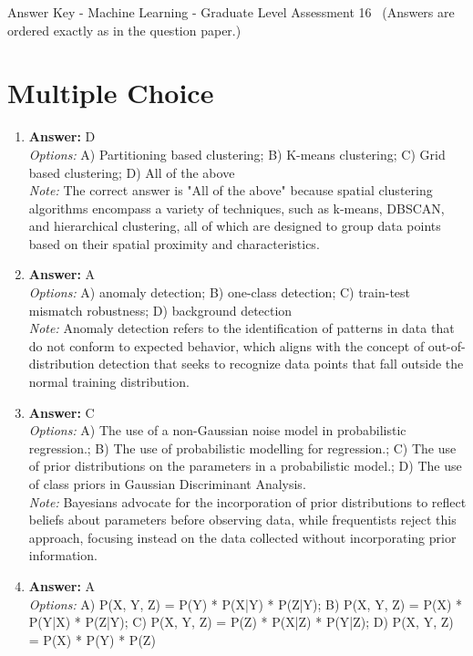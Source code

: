 \documentclass[12pt]{article}
\begin{document}
\begin{center}
Answer Key - Machine Learning - Graduate Level Assessment 16 \
\small (Answers are ordered exactly as in the question paper.)
\end{center}

\section*{Multiple Choice}
\begin{enumerate}[label=\arabic*.]
\item \textbf{Answer:} D
\\ \textit{Options:} A) Partitioning based clustering; B) K-means clustering; C) Grid based clustering; D) All of the above
\\ \textit{Note:} The correct answer is "All of the above" because spatial clustering algorithms encompass a variety of techniques, such as k-means, DBSCAN, and hierarchical clustering, all of which are designed to group data points based on their spatial proximity and characteristics.
\item \textbf{Answer:} A
\\ \textit{Options:} A) anomaly detection; B) one-class detection; C) train-test mismatch robustness; D) background detection
\\ \textit{Note:} Anomaly detection refers to the identification of patterns in data that do not conform to expected behavior, which aligns with the concept of out-of-distribution detection that seeks to recognize data points that fall outside the normal training distribution.
\item \textbf{Answer:} C
\\ \textit{Options:} A) The use of a non-Gaussian noise model in probabilistic regression.; B) The use of probabilistic modelling for regression.; C) The use of prior distributions on the parameters in a probabilistic model.; D) The use of class priors in Gaussian Discriminant Analysis.
\\ \textit{Note:} Bayesians advocate for the incorporation of prior distributions to reflect beliefs about parameters before observing data, while frequentists reject this approach, focusing instead on the data collected without incorporating prior information.
\item \textbf{Answer:} A
\\ \textit{Options:} A) P(X, Y, Z) = P(Y) * P(X|Y) * P(Z|Y); B) P(X, Y, Z) = P(X) * P(Y|X) * P(Z|Y); C) P(X, Y, Z) = P(Z) * P(X|Z) * P(Y|Z); D) P(X, Y, Z) = P(X) * P(Y) * P(Z)

\end{enumerate}
\end{document}
